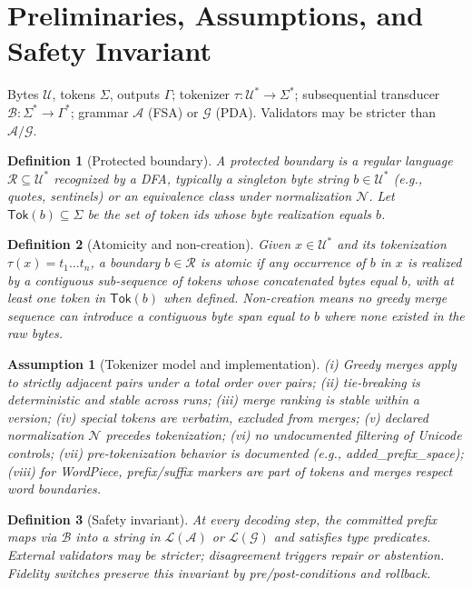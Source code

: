 \documentclass{article}
\newtheorem{assumption}{Assumption}
\newtheorem{definition}{Definition}
\begin{document}
\section{Preliminaries, Assumptions, and Safety Invariant}
Bytes $\mathcal{U}$, tokens $\Sigma$, outputs $\Gamma$; tokenizer $\tau:\mathcal{U}^\ast\to\Sigma^\ast$; subsequential transducer $\mathcal{B}:\Sigma^\ast\to\Gamma^\ast$; grammar $\mathcal{A}$ (FSA) or $\mathcal{G}$ (PDA). Validators may be stricter than $\mathcal{A}/\mathcal{G}$.

\begin{definition}[Protected boundary]
A protected boundary is a regular language $\mathcal{R}\subseteq\mathcal{U}^\ast$ recognized by a DFA, typically a singleton byte string $b\in\mathcal{U}^\ast$ (e.g., quotes, sentinels) or an equivalence class under normalization $\mathcal{N}$. Let $\mathsf{Tok}(b)\subseteq\Sigma$ be the set of token ids whose byte realization equals $b$.
\end{definition}

\begin{definition}[Atomicity and non-creation]
Given $x\in\mathcal{U}^\ast$ and its tokenization $\tau(x)=t_1\dots t_n$, a boundary $b\in\mathcal{R}$ is atomic if any occurrence of $b$ in $x$ is realized by a contiguous sub-sequence of tokens whose concatenated bytes equal $b$, with at least one token in $\mathsf{Tok}(b)$ when defined. Non-creation means no greedy merge sequence can introduce a contiguous byte span equal to $b$ where none existed in the raw bytes.
\end{definition}

\begin{assumption}[Tokenizer model and implementation]\label{assump:tok}
(i) Greedy merges apply to strictly adjacent pairs under a total order over pairs; (ii) tie-breaking is deterministic and stable across runs; (iii) merge ranking is stable within a version; (iv) special tokens are verbatim, excluded from merges; (v) declared normalization $\mathcal{N}$ precedes tokenization; (vi) no undocumented filtering of Unicode controls; (vii) pre-tokenization behavior is documented (e.g., added\_prefix\_space); (viii) for WordPiece, prefix/suffix markers are part of tokens and merges respect word boundaries.
\end{assumption}

\begin{definition}[Safety invariant]
At every decoding step, the committed prefix maps via $\mathcal{B}$ into a string in $\mathcal{L}(\mathcal{A})$ or $\mathcal{L}(\mathcal{G})$ and satisfies type predicates. External validators may be stricter; disagreement triggers repair or abstention. Fidelity switches preserve this invariant by pre/post-conditions and rollback.
\end{definition}
\end{document}

